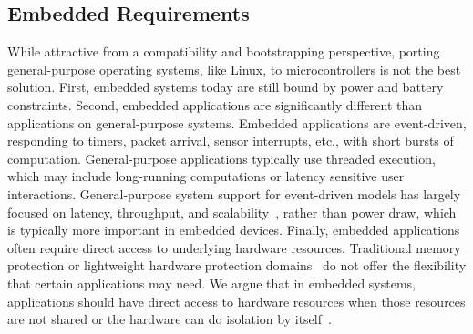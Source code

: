 \subsection{Embedded Requirements}
\label{sec:os:execution}

While attractive from a compatibility and bootstrapping perspective,
porting general-purpose operating systems, like Linux, to microcontrollers is
not the best solution. First, embedded systems today are still bound by power
and battery constraints.
Second, embedded applications are
significantly different than applications on general-purpose systems. Embedded
applications are event-driven, responding to timers, packet arrival, sensor
interrupts, etc., with short bursts of computation. General-purpose
applications typically use
threaded execution, which may include long-running computations or latency
sensitive user interactions. General-purpose system support for
event-driven models has largely focused on
latency, throughput, and scalability~\cite{epoll,libasync,ninja}, rather than
power draw, which is typically more important in embedded devices.
Finally, embedded applications often require direct access to underlying
hardware resources. Traditional memory protection or 
lightweight hardware protection
domains~\cite{nooks}
do not offer the flexibility that certain applications may need.
We argue that in embedded systems,
applications should have direct access to hardware resources when those
resources are not shared or the hardware can do isolation by
itself~\cite{ix:osdi2014}.



